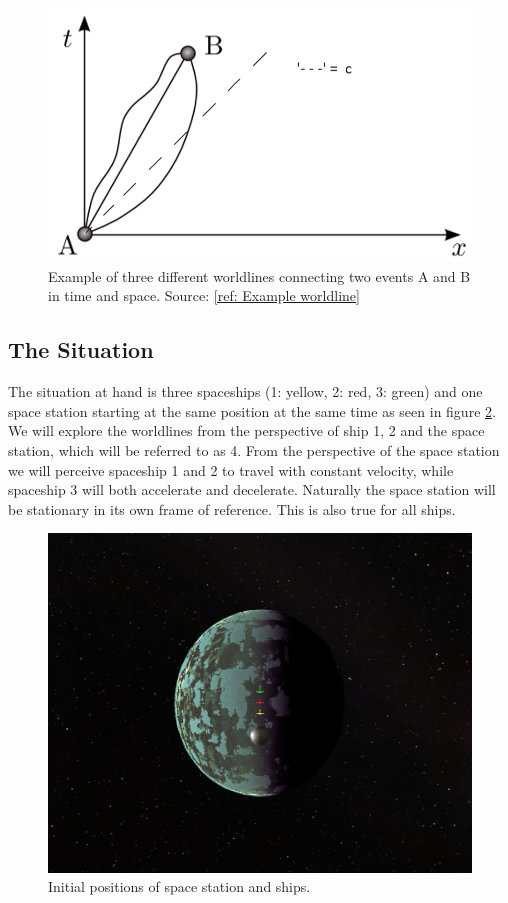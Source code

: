 \documentclass[reprint,english,notitlepage]{revtex4-2}
\begin{document}
  
  \begin{figure}[h!]
    \centering
    \includegraphics[scale = .5]{figures/worldline_example.png}
    \caption{Example of three different worldlines connecting two events A and B in time and space. Source: \ref{ref: Example worldline}}
    \label{fig: WL Example}
  \end{figure}
  
  \subsection{The Situation}
  The situation at hand is three spaceships (1: yellow, 2: red, 3: green) and one space station starting at the same position at the same time as seen in figure \ref{fig: Initial position}. We will explore the worldlines from the perspective of ship 1, 2 and the space station, which will be referred to as 4. From the perspective of the space station we will perceive spaceship 1 and 2 to travel with constant velocity, while spaceship 3 will both accelerate and decelerate. Naturally the space station will be stationary in its own frame of reference. This is also true for all ships. 
  \begin{figure}[h!]
    \centering
    \includegraphics[scale = .125]{figures/Spaceships_t_0.png}
    \caption{Initial positions of space station and ships.}
    \label{fig: Initial position}
  \end{figure}
  
\end{document}
